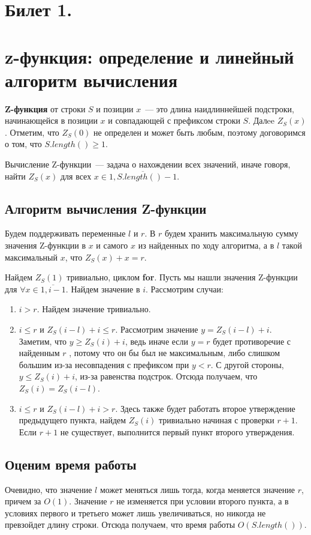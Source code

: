 \section{Билет 1.}
\section*{z-функция: определение и линейный алгоритм вычисления}
\par
\textbf{Z-функция} от строки $S$ и позиции $x$~--- это длина наидлиннейшей подстроки,
начинающейся в позиции $x$ и совпадающей с префиксом строки $S$. Далee $Z_S(x)$.
Отметим, что $Z_S(0)$ не определен и может быть любым, поэтому договоримся о том, что
$S.length() \geq 1$.

\par
Вычисление Z-функции~--- задача о нахождении всех значений, иначе говоря, найти
$Z_S(x)$ для всех $x \in \overline{1, S.length() - 1}$.

\subsection*{Алгоритм вычисления Z-функции}

Будем поддерживать переменные $l$ и $r$.
В $r$ будем хранить максимальную сумму значения Z-функции в $x$ и самого $x$ из найденных по ходу алгоритма,
а в $l$ такой максимальный $x$, что $Z_S(x) + x = r$.

\par
Найдем $Z_S(1)$ тривиально, циклом \textbf{for}. Пусть мы нашли значения Z-функции
для $\forall x \in \overline{1, i - 1}$. Найдем значение в $i$. Рассмотрим случаи:

\begin{enumerate}
    \item $i > r$.
Найдем значение тривиально.
    \item $i \leq  r$ и $Z_S(i - l) + i \leq r$. Рассмотрим значение $y = Z_S(i - l) + i$.
Заметим, что $y \geq  Z_S(i) + i$, ведь иначе если $y = r$ будет противоречие с найденным $r$ , потому что он бы был не максимальным,
либо слишком большим из-за несовпадения с префиксом при $y < r$. С другой стороны, $y \leq Z_S(i) + i$, из-за равенства подстрок.
Отсюда получаем, что $Z_S(i) = Z_S(i - l)$.
    \item $i \leq r$ и $Z_S(i - l) + i > r$. Здесь также будет работать второе утверждение предыдущего пункта, 
    найдем $Z_S(i)$ тривиально начиная с проверки $r+1$. Если $r+1$ не существует, выполнится первый пункт второго утверждения.
\end{enumerate}

\subsection*{Оценим время работы}
\par
Очевидно, что значение $l$ может меняться лишь тогда, когда меняется значение $r$, причем за $O(1)$.
Значение $r$ не изменяется при условии второго пункта, а в условиях первого и третьего может лишь увеличиваться,
но никогда не превзойдет длину строки. Отсюда получаем, что время работы $O(S.length())$.